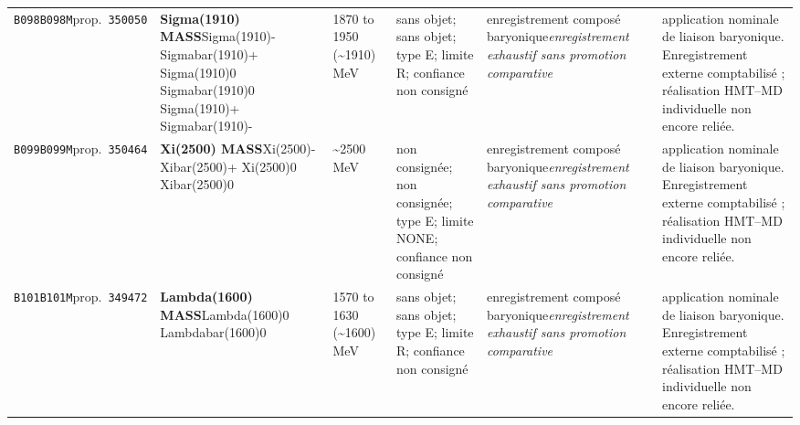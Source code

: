 \begin{landscape}
\begin{longtable}{L{1.85cm}L{4.45cm}L{2.35cm}L{4.05cm}L{3.35cm}L{7.15cm}}
\texttt{B098}\newline \texttt{B098M}\newline prop.\ \texttt{350050} & \textbf{Sigma(1910) MASS}\newline Sigma(1910)- \textbar{}\allowbreak{} Sigmabar(1910)+ \textbar{}\allowbreak{} Sigma(1910)0 \textbar{}\allowbreak{} Sigmabar(1910)0 \textbar{}\allowbreak{} Sigma(1910)+ \textbar{}\allowbreak{} Sigmabar(1910)- & 1870 to 1950 (\textasciitilde{}1910)\,MeV & sans objet; sans objet; type E; limite R; confiance non consigné & enregistrement composé baryonique\newline \emph{enregistrement exhaustif sans promotion comparative} & application nominale de liaison baryonique. Enregistrement externe comptabilisé ; réalisation HMT--MD individuelle non encore reliée. \\
\texttt{B099}\newline \texttt{B099M}\newline prop.\ \texttt{350464} & \textbf{Xi(2500) MASS}\newline Xi(2500)- \textbar{}\allowbreak{} Xibar(2500)+ \textbar{}\allowbreak{} Xi(2500)0 \textbar{}\allowbreak{} Xibar(2500)0 & \textasciitilde{}2500\,MeV & non consignée; non consignée; type E; limite NONE; confiance non consigné & enregistrement composé baryonique\newline \emph{enregistrement exhaustif sans promotion comparative} & application nominale de liaison baryonique. Enregistrement externe comptabilisé ; réalisation HMT--MD individuelle non encore reliée. \\
\texttt{B101}\newline \texttt{B101M}\newline prop.\ \texttt{349472} & \textbf{Lambda(1600) MASS}\newline Lambda(1600)0 \textbar{}\allowbreak{} Lambdabar(1600)0 & 1570 to 1630 (\textasciitilde{}1600)\,MeV & sans objet; sans objet; type E; limite R; confiance non consigné & enregistrement composé baryonique\newline \emph{enregistrement exhaustif sans promotion comparative} & application nominale de liaison baryonique. Enregistrement externe comptabilisé ; réalisation HMT--MD individuelle non encore reliée. \\

\end{longtable}
\end{landscape}
